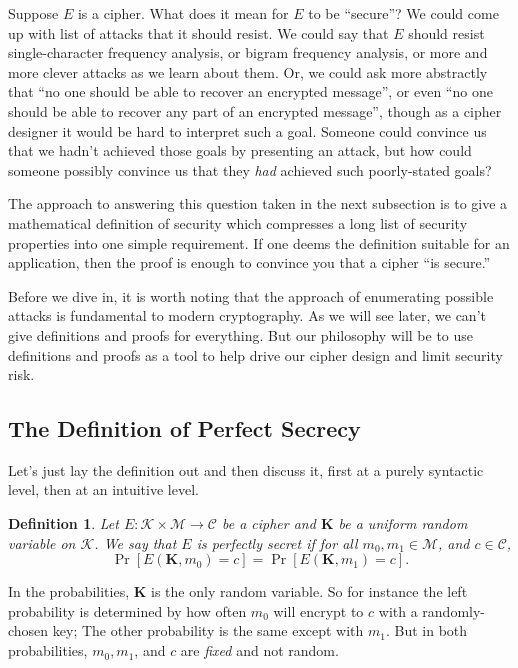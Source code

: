 \documentclass[11pt]{article}
\newtheorem{definition}{Definition}
\newcommand{\msgs}{\mathcal{M}}
\newcommand{\ctxts}{\mathcal{C}}
\newcommand{\keys}{\mathcal{K}}
\newcommand{\enc}{E}
\newcommand{\bK}{\mathbf{K}}
\begin{document}
Suppose $E$ is a cipher. What does it mean for $E$ to be ``secure''? We could come
up with list of attacks that it should resist. We could say that $E$ should
resist single-character frequency analysis, or bigram frequency analysis, or
more and more clever attacks as we learn about them.  Or, we could ask
more abstractly that ``no one should be able to recover an encrypted message'',
or even ``no one should be able to recover any part of an encrypted message'',
though as a cipher designer it would be hard to interpret such a goal. Someone
could convince us that we hadn't achieved those goals by presenting an attack,
but how could someone possibly convince us that they \emph{had} achieved 
such poorly-stated goals? 

The approach to answering this question taken in the next subsection is to give
a mathematical definition of security which compresses a long list of
security properties into one simple requirement. If one deems the
definition suitable for an application, then the proof is enough to convince
you that a cipher ``is secure.''

Before we dive in, it is worth noting that the approach of enumerating possible
attacks is fundamental to modern cryptography. As we will see later, we can't
give definitions and proofs for everything. But our philosophy will be to use
definitions and proofs as a tool to help drive our cipher design and limit
security risk.

\subsection{The Definition of Perfect Secrecy}

Let's just lay the definition out and then discuss it, first at a purely
syntactic level, then at an intuitive level.
\begin{definition}Let $\enc : \keys\times\msgs \to \ctxts$ be a cipher and
    $\bK$ be a uniform random variable on $\keys$.  We say that $\enc$ is
    \emph{perfectly secret} if for all $m_0,m_1\in\msgs$, and $c\in\ctxts$,
    \[
        \Pr[\enc(\bK,m_0) = c] = \Pr[\enc(\bK,m_1) = c].
    \]
\end{definition}
In the probabilities, $\bK$ is the only random variable. So for instance
the left probability is determined by how often $m_0$ will encrypt to
$c$ with a randomly-chosen key; The other probability is the same except
with $m_1$. But in both probabilities, $m_0,m_1$, and $c$ are \emph{fixed}
and not random.
\end{document}

